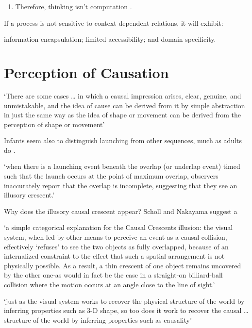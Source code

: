 \documentclass[12pt]{extarticle}
\begin{document}
\begin{multicols}{3}
\begin{enumerate}
\item Therefore, thinking isn’t computation \citep{Fodor:2000cj}.
 
\end{enumerate}
 
If a process is not sensitive to context-dependent relations, it will exhibit:

information encapsulation;
limited accessibility; and
domain specificity.
\citep{Butterfill:2007pe}
 
 
 
\section{Perception of Causation}
 
‘There are some cases … in which a causal impression arises, clear, genuine, and unmistakable, and the idea of cause can be derived from it by simple abstraction in just the same way as the idea of shape or movement can be derived from the perception of shape or movement’
\citep[p.\ 270--1]{Michotte:1946nz}
 
Infants seem also to distinguish launching from other sequences, much as adults do \citep{Leslie:1987nr}.
 
‘when there is a launching event beneath the overlap (or underlap event) timed such that the launch occurs at the point of maximum overlap, observers inaccurately report that the overlap is incomplete, suggesting that they see an illusory crescent.’
\citep[p.\ 461]{Scholl:2004dx}
 
Why does the illusory causal crescent appear? Scholl and Nakayama suggest a
 
‘a simple categorical explanation for the Causal Crescents illusion: the visual system, when led by other means to perceive an event as a causal collision, effectively ‘refuses’ to see the two objects as fully overlapped, because of an internalized constraint to the effect that such a spatial arrangement is not physically possible. As a result, a thin crescent of one object remains uncovered by the other one-as would in fact be the case in a straight-on billiard-ball collision where the motion occurs at an angle close to the line of sight.’
\citep[p.\ 466]{Scholl:2004dx}
 
‘just as the visual system works to recover the physical structure of the world by inferring properties such as 3-D shape, so too does it work to recover the causal … structure of the world by inferring properties such as causality’
\citep[p.\ 299]{Scholl:2000eq}
 

\end{multicols}
\end{document}
